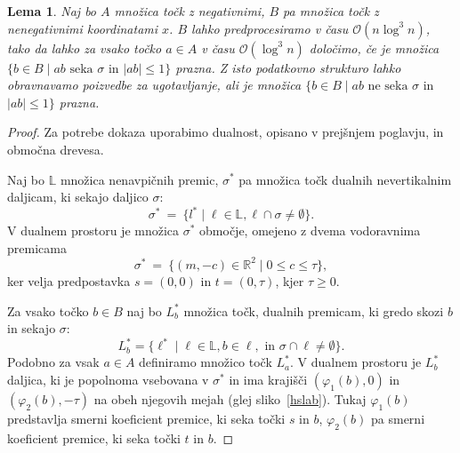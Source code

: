 \documentclass[a4paper, 12pt]{book}
\newcommand{\LL}{\ensuremath{\mathbb L}}
\newcommand{\RR}{\ensuremath{\mathbb R}}  %
\newcommand{\OO}{\ensuremath{\mathcal{O}}} %
\newtheorem{lema}[izrek]{Lema}
\begin{document}
\begin{lema}
\label{lema-ds2}
Naj bo $A$ množica točk z negativnimi, $B$ pa množica točk z nenegativnimi koordinatami $x$. $B$ lahko predprocesiramo v času $\OO(n\log^3n)$, tako da lahko za vsako točko $a\in A$ v času $\OO(\log^3n)$ določimo, če je množica $\{ b\in B \mid \text{$ab$ seka $\sigma$ in $|ab|\le 1$}\}$ prazna. Z isto podatkovno strukturo lahko obravnavamo poizvedbe za ugotavljanje, ali je množica $\{ b\in B \mid \text{$ab$ ne seka $\sigma$ in }$ \\ $\text{$|ab|\le 1$}\}$ prazna.
\end{lema}

\begin{proof}
Za potrebe dokaza uporabimo dualnost, opisano v prejšnjem poglavju, in območna drevesa.

Naj bo $\LL$ množica nenavpičnih premic, $\sigma^*$ pa množica točk dualnih nevertikalnim daljicam, ki sekajo daljico $\sigma$:
\[
		\sigma^* ~=~ \{ l^* \mid \ell\in \LL, \ell\cap \sigma\neq \emptyset\}.
\]
V dualnem prostoru je množica $\sigma^*$ območje, omejeno z dvema vodoravnima premicama
\[
		\sigma^* ~=~ \{ (m,-c)\in \RR^2\mid 0\le c\le \tau\},
\]
ker velja predpostavka $s=(0,0)$ in $t=(0,\tau)$, kjer $\tau\ge 0$.


Za vsako točko $b\in B$ naj bo $L^* _b$ množica točk, dualnih premicam, ki gredo skozi $b$ in sekajo $\sigma$:
\[
		L^*_b=\{ \ell^* \mid \ell\in \LL, b \in \ell, \text{ in } \sigma\cap \ell\not= \emptyset\}.
	\]
Podobno za vsak $a\in A$ definiramo množico točk $L^* _a$. V dualnem prostoru je $L^* _b$ daljica, ki je popolnoma vsebovana v $\sigma^*$ in ima krajišči $(\varphi_1(b),0)$ in $(\varphi_2(b),-\tau)$ na obeh njegovih mejah (glej sliko~\ref{hslab}). Tukaj $\varphi_1(b)$ predstavlja smerni koeficient premice, ki seka točki $s$ in $b$, $\varphi_2(b)$ pa smerni koeficient premice, ki seka točki $t$ in $b$.


\end{proof}
\end{document}
